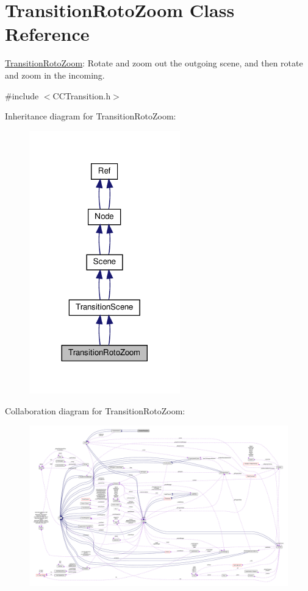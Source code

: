 \hypertarget{classTransitionRotoZoom}{}\section{Transition\+Roto\+Zoom Class Reference}
\label{classTransitionRotoZoom}


\hyperlink{classTransitionRotoZoom}{Transition\+Roto\+Zoom}\+: Rotate and zoom out the outgoing scene, and then rotate and zoom in the incoming.  




{\ttfamily \#include $<$C\+C\+Transition.\+h$>$}



Inheritance diagram for Transition\+Roto\+Zoom\+:
\nopagebreak
\begin{figure}[H]
\begin{center}
\leavevmode
\includegraphics[width=185pt]{classTransitionRotoZoom__inherit__graph}
\end{center}
\end{figure}


Collaboration diagram for Transition\+Roto\+Zoom\+:
\nopagebreak
\begin{figure}[H]
\begin{center}
\leavevmode
\includegraphics[width=350pt]{classTransitionRotoZoom__coll__graph}
\end{center}
\end{figure}
